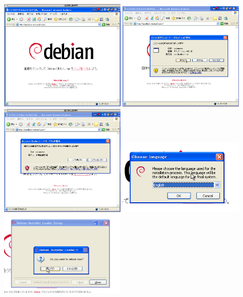 \documentclass[mingoth,a4paper]{jsarticle}
\begin{document}
\includegraphics[width=6cm]{image200703/goodbyemicrosoftcom1.png}
\includegraphics[width=6cm]{image200703/goodbyemicrosoftcom2.png}\\
\includegraphics[width=6cm]{image200703/goodbyemicrosoftcom3.png}
\includegraphics[width=6cm]{image200703/goodbyemicrosoftcom4.png}\\
\includegraphics[width=6cm]{image200703/goodbyemicrosoftcom5.png}
\end{document}
